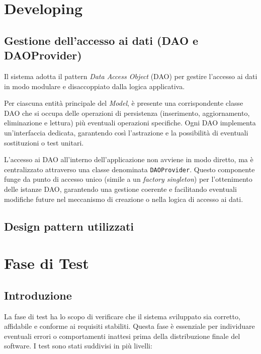 \documentclass[a4paper]{article}
\begin{document}
\section{Developing}
\subsection{Gestione dell’accesso ai dati (DAO e DAOProvider)}
Il sistema adotta il pattern \textit{Data Access Object} (DAO) per gestire l’accesso ai dati in modo modulare e disaccoppiato dalla logica applicativa.

Per ciascuna entità principale del \textit{Model}, è presente una corrispondente classe DAO che si occupa delle operazioni di persistenza (inserimento, aggiornamento, eliminazione e lettura) più eventuali operazioni specifiche. Ogni DAO implementa un’interfaccia dedicata, garantendo così l’astrazione e la possibilità di eventuali sostituzioni o test unitari.

L’accesso ai DAO all’interno dell’applicazione non avviene in modo diretto, ma è centralizzato attraverso una classe denominata \texttt{DAOProvider}. Questo componente funge da punto di accesso unico (simile a un \textit{factory singleton}) per l’ottenimento delle istanze DAO, garantendo una gestione coerente e facilitando eventuali modifiche future nel meccanismo di creazione o nella logica di accesso ai dati.


\subsection{Design pattern utilizzati}


\section{Fase di Test}
\subsection{Introduzione}
La fase di test ha lo scopo di verificare che il sistema sviluppato sia corretto, affidabile e conforme ai requisiti stabiliti.
Questa fase è essenziale per individuare eventuali errori o comportamenti inattesi prima della distribuzione finale del software.
I test sono stati suddivisi in più livelli:
\end{document}

